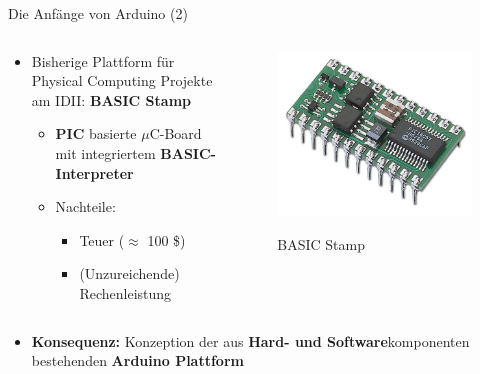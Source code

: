 \documentclass{beamer}
\begin{document}
\begin{frame}{Die Anf\"ange von Arduino (2)}
\begin{columns}
	\begin{column}{0.7\textwidth}
	\begin{itemize}
		\item Bisherige Plattform f\"ur Physical Computing Projekte am IDII: \textbf{BASIC Stamp}
		\begin{itemize}
			\item \textbf{PIC} basierte $\mu{}$C-Board mit integriertem \textbf{BASIC-Interpreter}
			\item Nachteile:
			\begin{itemize}
				\item Teuer ($\approx$ 100 \$)
				\item (Unzureichende) Rechenleistung
			\end{itemize}
		\end{itemize}
	\end{itemize}
	\end{column}
	\begin{column}{0.3\textwidth}
		\begin{figure}[H]
			\centering
			\includegraphics[width=1.0\textwidth]{./images/basic-stamp.jpg}
			\label{fig:basic-stamp}
			\caption{BASIC Stamp\cite{Image:BasicSTAMP}}
		\end{figure}
	\end{column}
\end{columns}
\vspace{20px}
\begin{itemize}
	\item \textbf{Konsequenz:} Konzeption der aus \textbf{Hard- und Software}komponenten bestehenden \textbf{Arduino Plattform}
\end{itemize}
\end{frame}
\end{document}
